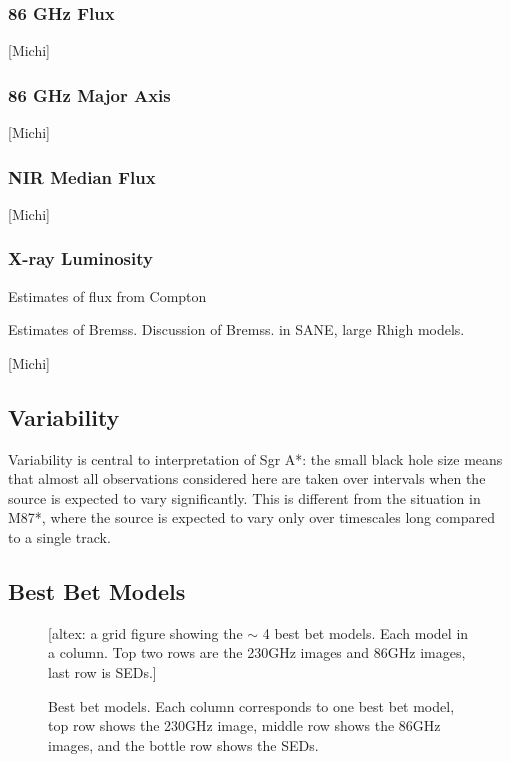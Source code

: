 \subsubsection{86 GHz Flux}

[Michi]

\subsubsection{86 GHz Major Axis}

[Michi]

\subsubsection{NIR Median Flux}

[Michi]

\subsubsection{X-ray Luminosity}

Estimates of flux from Compton

Estimates of Bremss.  Discussion of Bremss. in SANE, large Rhigh models.

[Michi]

\subsection{Variability}

Variability is central to interpretation of Sgr A*: the small black hole size means that almost all observations considered here are taken over intervals when the source is expected to vary significantly.  This is different from the situation in M87*, where the source is expected to vary only over timescales long compared to a single track.

\subsection{Best Bet Models}

\begin{figure}
    \centering
    [altex: a grid figure showing the $\sim$ 4 best bet models.  Each model in a column.  Top two rows are the 230GHz images and 86GHz images, last row is SEDs.]
    \caption{Best bet models.  Each column corresponds to one best bet model, top row shows the 230GHz image, middle row shows the 86GHz images, and the bottle row shows the SEDs.}
    \label{fig:my_label}
\end{figure}
